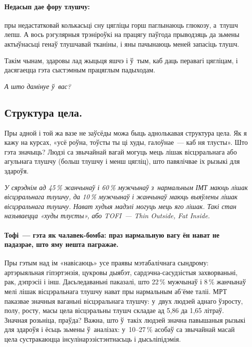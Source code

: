 \paragraph{Недасып дае фору тлушчу:} пры недастатковай колькасьці сну цягліцы горш паглынаюць глюкозу, а~тлушч лепш. А вось рэгулярныя трэніроўкі на працягу паўгода прыводзяць да зьмены актыўнасьці генаў тлушчавай тканіны, і яны пачынаюць меней запасіць тлушч. 

Такім чынам, здаровы лад жыцьця яшчэ і ў~тым, каб даць перавагі цягліцам, і дасягаецца гэта сыстэмным працяглым падыходам. 

\emph{А што дамінуе ў~вас?}

\subsection*{Структура цела.} 
Пры адной і той жа вазе не заўсёды можа быць аднолькавая структура цела. Як я кажу на курсах, «усё роўна, тоўсты ты ці худы, галоўнае~--- каб ня тлусты». Што гэта значыць? Людзі са звычайнай вагай могуць мець лішак вісцэральнага або агульнага тлушчу (больш тлушчу і менш цягліц), што павялічвае іх рызыкі для здароўя.

\emph{У сярэднім ад 45\,\% жанчынаў і 60\,\% мужчынаў з~нармальным ІМТ маюць лішак вісцэральнага тлушчу, да 10\,\% мужчынаў і жанчынаў маюць выяўлены лішак вісцэральнага тлушчу. Нават худыя мадэлі могуць мець яго лішак. Такі стан называецца «худы тлусты», або TOFI~--- Thin Outside, Fat Inside.}

\paragraph{Тофі~--- гэта як чалавек-бомба: праз нармальную вагу ён нават не падазрае, што яму нешта пагражае.} Пры гэтым над ім «навісаюць» усе праявы мэтабалічнага сындрому: артэрыяльная гіпэртэнзія, цукровы дыябэт, сардэчна-сасудзістыя захворваньні, рак, дэпрэсіі і інш. Дасьледаваньні паказалі, што 22\,\% мужчынаў і 8\,\% жанчынаў мелі лішак вісцэральнага тлушчу нават пры нармальным аб'ёме таліі. МРТ паказвае значныя ваганьні вісцэральнага тлушчу: у~двух людзей аднаго ўзросту, полу, росту, масы цела вісцэральны тлушч складае ад 5,86 да 1,65 літраў. Значная розьніца, праўда? Важна, што ў~такіх людзей значна павышаныя рызыкі для здароўя і ёсьць зьмены ў~аналізах: у~10--27\,\% асобаў са звычайнай масай цела сустракаюцца інсулінарэзістэнтнасьць і дысьліпідэмія.

